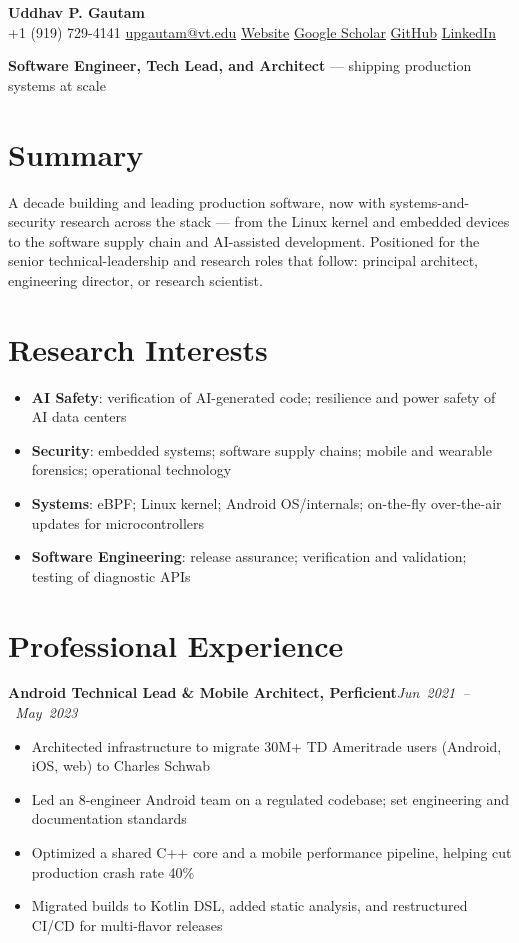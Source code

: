 \documentclass[10pt]{article}
\newcommand{\entry}[2]{%
 \par\needspace{3\baselineskip}\vspace{12pt}%
 {\noindent\textbf{#1}\hfill\mbox{\small\itshape #2}\par}%
}
\newcommand{\cvsection}[1]{\needspace{5\baselineskip}\section*{#1}}
\begin{document}
\begin{center}
{\LARGE\bfseries Uddhav P. Gautam}\\[0.5em]
{\small
+1 (919) 729-4141 \;\textbullet\;
\href{mailto:upgautam@vt.edu}{upgautam@vt.edu}
\;\textbullet\;
\href{https://uddhavpgautam.github.io}{Website}
\;\textbullet\;
\href{https://scholar.google.com/citations?hl=en&user=Rbmabp4AAAAJ}{Google Scholar}
\;\textbullet\;
\href{https://github.com/uddhavpgautam}{GitHub}
\;\textbullet\;
\href{https://www.linkedin.com/in/uddhavpgautam/}{LinkedIn}
}
\end{center}


\begin{center}
{\small\textbf{Software Engineer, Tech Lead, and Architect} --- shipping production systems at scale}
\end{center}

\vspace{2pt}

\cvsection{Summary}
A decade building and leading production software, now with systems-and-security research across the stack --- from the Linux kernel and embedded devices to the software supply chain and AI-assisted development. Positioned for the senior technical-leadership and research roles that follow: principal architect, engineering director, or research scientist.

\cvsection{Research Interests}
\begin{itemize}
 \item \textbf{AI Safety}: verification of AI-generated code; resilience and power safety of AI data centers
 \item \textbf{Security}: embedded systems; software supply chains; mobile and wearable forensics; operational technology
 \item \textbf{Systems}: eBPF; Linux kernel; Android OS/internals; on-the-fly over-the-air updates for microcontrollers
 \item \textbf{Software Engineering}: release assurance; verification and validation; testing of diagnostic APIs
\end{itemize}

\cvsection{Professional Experience}
\entry{Android Technical Lead \& Mobile Architect, Perficient}{Jun 2021 -- May 2023}
\begin{itemize}
 \item Architected infrastructure to migrate 30M+ TD Ameritrade users (Android, iOS, web) to Charles Schwab
 \item Led an 8-engineer Android team on a regulated codebase; set engineering and documentation standards
 \item Optimized a shared C++ core and a mobile performance pipeline, helping cut production crash rate 40\%
 \item Migrated builds to Kotlin DSL, added static analysis, and restructured CI/CD for multi-flavor releases
\end{itemize}
\end{document}
